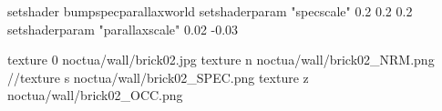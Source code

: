 setshader bumpspecparallaxworld
setshaderparam "specscale" 0.2 0.2 0.2
setshaderparam "parallaxscale" 0.02 -0.03

texture 0 noctua/wall/brick02.jpg
texture n noctua/wall/brick02_NRM.png
//texture s noctua/wall/brick02_SPEC.png
texture z noctua/wall/brick02_OCC.png

